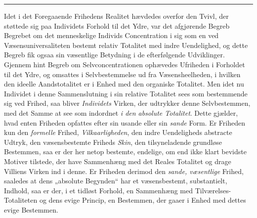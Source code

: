 \begin{center}\rule{2cm}{0.4pt}\end{center}

 Idet i det Foregaaende Frihedens Realitet hævdedes overfor den Tvivl, der
støttede sig paa Individets Forhold til det Ydre, var det afgjørende Begreb
Begrebet om det menneskelige Individs Concentration i sig som en ved
Væsensuniversaliteten bestemt relativ Totalitet med indre Uendelighed, og dette
Begreb fik ogsaa sin væsentlige Betydning i de efterfølgende Udviklinger.
Gjennem hint Begreb om Selvconcentrationen ophævedes Ufriheden i Forholdet til
det Ydre, og omsattes i Selvbestemmelse ud fra Væsensheelheden, i hvilken den
ideelle Aandstotalitet er i Enhed med den organiske Totalitet. Men idet nu
Individet i denne Sammenslutning i sin relative Totalitet sees som bestemmende
sig ved Frihed, saa bliver \emph{Individets} Virken, der udtrykker denne
Selvbestemmen, med det Samme at see som indordnet \emph{i den absolute
Totalitet}. Dette gjælder, hvad enten Friheden opfattes efter sin usande eller
sin \emph{sande} Form. Er Friheden kun den \emph{formelle} Frihed,
\emph{Vilkaarligheden}, den indre Uendeligheds abstracte Udtryk, den
væsensbestemte Friheds \emph{Skin}, den tilsyneladende grundløse Bestemmen, saa
er der her netop bestemte, endelige, om end ikke klart bevidste Motiver
tilstede, der have Sammenhæng med det Reales Totalitet og drage Villiens Virken
ind i denne. Er Friheden derimod den \emph{sande, væsentlige} Frihed, saaledes
at dens „absolute Begynden“ har et væsensbestemt, substantielt, Indhold, saa er
der, i et tidløst Forhold, en Sammenhæng med Tilværelses-Totaliteten og dens
evige Princip, en Bestemmen, der gaaer i Enhed med dettes evige Bestemmen.

